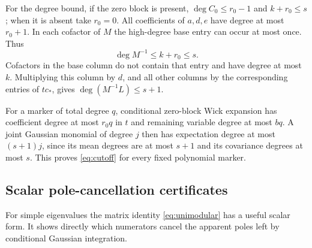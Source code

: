 \documentclass[11pt]{article}
\theoremstyle{definition}\newtheorem{definition}[theorem]{Definition}
\theoremstyle{remark}\newtheorem{remark}[theorem]{Remark}
\begin{document}
For the degree bound, if the zero block is
present, $\deg C_0\le r_0-1$ and $k+r_0\le s$; when it is
absent take $r_0=0$. All coefficients of $a,d,e$ have degree
at most $r_0+1$. In each cofactor of $M$ the high-degree base
entry can occur at most once. Thus
\[
 \deg M^{-1}\le k+r_0\le s.
\]
Cofactors in the base column do not contain that entry and
have degree at most $k$. Multiplying this column by $d$, and
all other columns by the corresponding entries of $tc_*$,
gives $\deg(M^{-1}L)\le s+1$.

For a marker of total degree $q$, conditional zero-block Wick
expansion has coefficient degree at most $r_0q$ in $t$ and
remaining variable degree at most $bq$. A joint Gaussian
monomial of degree $j$ then has expectation degree at most
$(s+1)j$, since its mean degrees are at most $s+1$ and its
covariance degrees at most $s$. This proves
\eqref{eq:cutoff} for every fixed polynomial marker.

\subsection{Scalar pole-cancellation certificates}

For simple eigenvalues the matrix identity \eqref{eq:unimodular} has a
useful scalar form. It shows directly which numerators cancel the
apparent poles left by conditional Gaussian integration.
\end{document}
